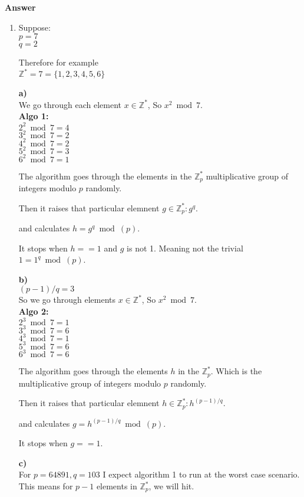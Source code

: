 \documentclass[12pt]{article}
\begin{document}
\textbf{Answer}
\begin{enumerate}
\item[]
Suppose: \\
\( p = 7 \) \\
\( q = 2 \)

Therefore for example \\
\( \mathbb{Z}^{*} = 7 = \{1,2,3,4,5,6\} \)

\textbf{a)} \\
We go through each element \( x \in  \mathbb{Z}^{*} \), So \( x^2 \bmod 7 \). \\
\textbf{Algo 1:} \\
\( 2^2 \bmod 7 = 4 \) \\
\( 3^2 \bmod 7 = 2 \) \\
\( 4^2 \bmod 7 = 2 \) \\
\( 5^2 \bmod 7 = 3 \) \\
\( 6^2 \bmod 7 = 1 \)

The algorithm goes through the elements in the \( \mathbb{Z}^{*}_p \)
multiplicative group of integers modulo \( p \) randomly.

Then it raises that particular elemnent \( g \in \mathbb{Z}^{*}_p : g^q \).

and calculates \( h = g^q \bmod(p) \).

It stops when \( h == 1 \) and \( g \) is not 1. Meaning not the trivial \( 1 = 1^q \bmod(p) \).

\textbf{b)} \\
\( (p-1)/q = 3 \) \\
So  we go through elements \( x \in \mathbb{Z}^{*} \), So \( x^2 \bmod 7 \). \\
\textbf{Algo 2:} \\
\( 2^3 \bmod 7 = 1 \) \\
\( 3^3 \bmod 7 = 6 \) \\
\( 4^3 \bmod 7 = 1 \) \\
\( 5^3 \bmod 7 = 6 \) \\
\( 6^3 \bmod 7 = 6 \)

The algorithm goes through the elements \( h \) in the \( \mathbb{Z}^{*}_p \). Which is the
multiplicative group of integers modulo \( p \) randomly.

Then it raises that particular elemnent \( h \in \mathbb{Z}^{*}_p : h^{(p-1)/q} \).

and calculates \( g = h^{(p-1)/q} \bmod(p) \).

It stops when \( g == 1 \).

\textbf{c)} \\
For \( p = 64891, q = 103 \) I expect algorithm 1 to run at the worst case scenario.
This means for \( p - 1 \) elements in  \( \mathbb{Z}^{*}_p \), we will hit.


\end{enumerate}
\end{document}
